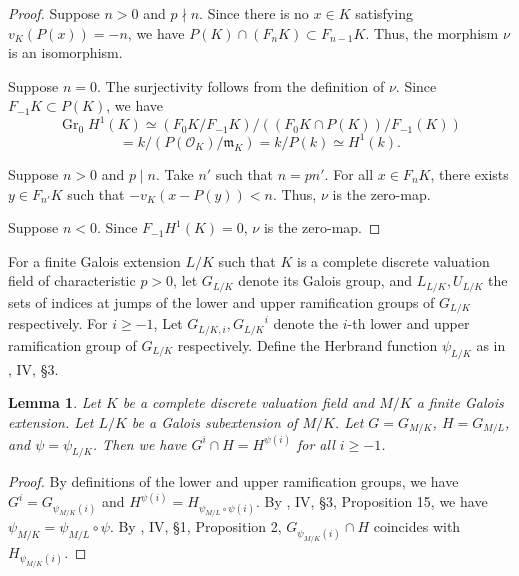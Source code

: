 \documentclass[10pt,a4paper]{amsart}
\numberwithin{equation}{section}
\newcommand{\Gr}{\operatorname{Gr}}
\theoremstyle{plain}
\newtheorem{lemm}[theo]{Lemma}
\theoremstyle{definition}
\begin{document}
\begin{proof}
  Suppose $n>0$ and $p\nmid n$. Since there is no $x\in K$ satisfying $v_K(P(x))=-n$, we have $P(K)\cap(F_nK)\subset F_{n-1}K$. Thus, the morphism $\nu$ is an isomorphism.

Suppose $n=0$. The surjectivity follows from the definition of $\nu$. Since $F_{-1}K\subset P(K)$, we have
\[
\Gr_0H^1(K)\simeq (F_0K/F_{-1}K)/((F_0K\cap P(K))/F_{-1}(K))
\]
\begin{equation}
=k/(P(\mathcal{O}_K)/\mathfrak{m}_K)=k/P(k)\simeq H^1(k).
\end{equation}


Suppose $n>0$ and $p\mid n$. Take $n'$ such that $n=pn'$. For all $x\in F_nK$, there exists $y\in F_{n'}K$ such that $-v_K(x-P(y))<n$. Thus, $\nu$ is the zero-map.

Suppose $n<0$. Since $F_{-1}H^1(K)=0$, $\nu$ is the zero-map.
\end{proof}

For a finite Galois extension $L/K$ such that $K$ is a complete discrete valuation field of characteristic $p>0$, let $G_{L/K}$ denote its Galois group, and $L_{L/K},U_{L/K}$ the sets of indices at jumps of the lower and upper ramification groups of $G_{L/K}$ respectively. For $i\geq -1$, Let $G_{L/K,i},{G_{L/K}}^i$ denote the $i$-th lower and upper ramification group of $G_{L/K}$ respectively. Define the Herbrand function $\psi_{L/K}$ as in \cite{Se}, IV, \S 3.

\begin{lemm}\label{lab}
  Let $K$ be a complete discrete valuation field and $M/K$ a finite Galois extension. Let $L/K$ be a Galois subextension of $M/K$. Let $G=G_{M/K}$, $H=G_{M/L}$, and $\psi=\psi_{L/K}$. Then we have $G^i\cap H=H^{\psi(i)}$ for all $i\geq -1$.
\end{lemm}
\begin{proof} By definitions of the lower and upper ramification groups, we have $G^{i}=G_{\psi_{M/K}(i)}$ and $H^{\psi(i)}=H_{\psi_{M/L}\circ\psi(i)}$. By \cite{Se}, IV, \S 3, Proposition 15, we have $\psi_{M/K}=\psi_{M/L}\circ\psi$. By \cite{Se}, IV, \S 1, Proposition 2, $G_{\psi_{M/K}(i)}\cap H$ coincides with $H_{\psi_{M/K}(i)}$.
\end{proof}
\end{document}
